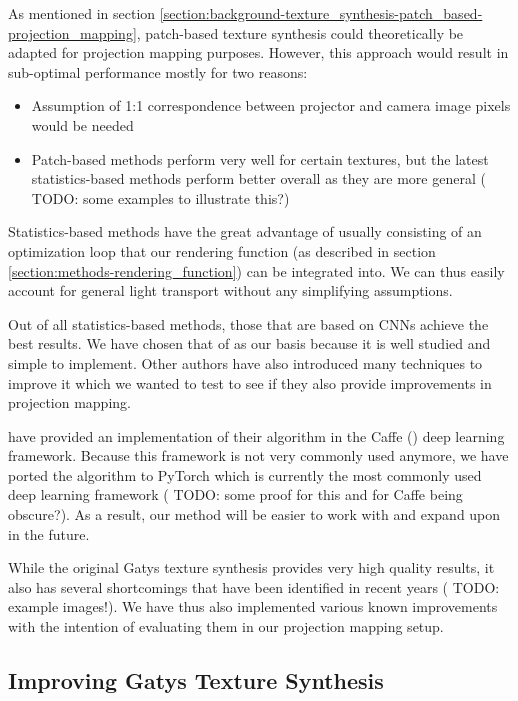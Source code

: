 As mentioned in section \ref{section:background-texture_synthesis-patch_based-projection_mapping}, patch-based texture synthesis could theoretically be adapted for projection mapping purposes. However, this approach would result in sub-optimal performance mostly for two reasons:

\begin{itemize}
    \item Assumption of 1:1 correspondence between projector and camera image pixels would be needed
    \item Patch-based methods perform very well for certain textures, but the latest statistics-based methods perform better overall as they are more general ({\color{red} TODO: some examples to illustrate this?})
\end{itemize}

Statistics-based methods have the great advantage of usually consisting of an optimization loop that our rendering function (as described in section \ref{section:methods-rendering_function}) can be integrated into. We can thus easily account for general light transport without any simplifying assumptions.

Out of all statistics-based methods, those that are based on CNNs achieve the best results. We have chosen that of \citet{Gatys2015} as our basis because it is well studied and simple to implement. Other authors have also introduced many techniques to improve it which we wanted to test to see if they also provide improvements in projection mapping.

\citet{Gatys2015} have provided an implementation of their algorithm in the Caffe (\citet{Jia2014}) deep learning framework. Because this framework is not very commonly used anymore, we have ported the algorithm to PyTorch which is currently the most commonly used deep learning framework ({\color{red} TODO: some proof for this and for Caffe being obscure?}). As a result, our method will be easier to work with and expand upon in the future.

While the original Gatys texture synthesis provides very high quality results, it also has several shortcomings that have been identified in recent years ({\color{red} TODO: example images!}). We have thus also implemented various known improvements with the intention of evaluating them in our projection mapping setup.

\subsection{Improving Gatys Texture Synthesis}
\label{section:methods-texture_model-improvements}

